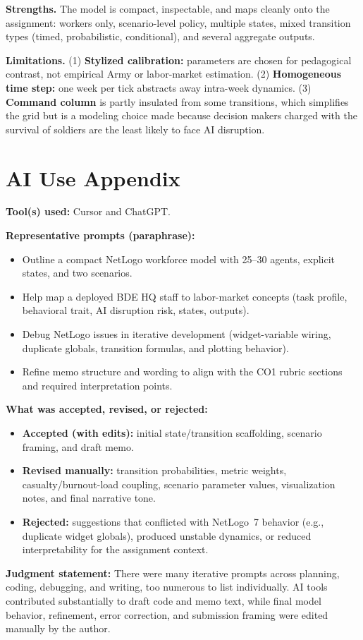 \documentclass[11pt,letterpaper]{article}
\begin{document}
\textbf{Strengths.} The model is compact, inspectable, and maps cleanly onto the assignment: workers only, scenario-level policy, multiple states, mixed transition types (timed, probabilistic, conditional), and several aggregate outputs.

\textbf{Limitations.} (1) \textbf{Stylized calibration:} parameters are chosen for pedagogical contrast, not empirical Army or labor-market estimation. (2) \textbf{Homogeneous time step:} one week per tick abstracts away intra-week dynamics. (3) \textbf{Command column} is partly insulated from some transitions, which simplifies the grid but is a modeling choice made because decision makers charged with the survival of soldiers are the least likely to face AI disruption. 

\section*{AI Use Appendix}

\textbf{Tool(s) used:} Cursor and ChatGPT.

\textbf{Representative prompts (paraphrase):}
\begin{itemize}[leftmargin=*]
  \item Outline a compact NetLogo workforce model with 25--30 agents, explicit states, and two scenarios.
  \item Help map a deployed BDE HQ staff to labor-market concepts (task profile, behavioral trait, AI disruption risk, states, outputs).
  \item Debug NetLogo issues in iterative development (widget-variable wiring, duplicate globals, transition formulas, and plotting behavior).
  \item Refine memo structure and wording to align with the CO1 rubric sections and required interpretation points.
\end{itemize}

\textbf{What was accepted, revised, or rejected:}
\begin{itemize}[leftmargin=*]
  \item \textbf{Accepted (with edits):} initial state/transition scaffolding, scenario framing, and draft memo.
  \item \textbf{Revised manually:} transition probabilities, metric weights, casualty/burnout-load coupling, scenario parameter values, visualization notes, and final narrative tone.
  \item \textbf{Rejected:} suggestions that conflicted with NetLogo~7 behavior (e.g., duplicate widget globals), produced unstable dynamics, or reduced interpretability for the assignment context.
\end{itemize}

\textbf{Judgment statement:} There were many iterative prompts across planning, coding, debugging, and writing, too numerous to list individually. AI tools contributed substantially to draft code and memo text, while final model behavior, refinement, error correction, and submission framing were edited manually by the author.
\end{document}
